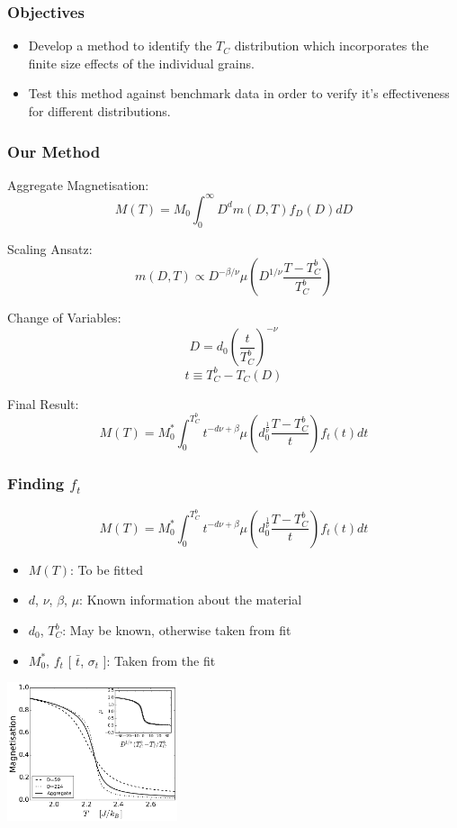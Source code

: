 \documentclass{beamer}
\begin{document}
\begin{frame}
	\frametitle{Objectives}
	\begin{itemize}
		\item{Develop a method to identify the $T_C$ distribution which incorporates the finite size effects of the individual grains.\newline}
		\item{Test this method against benchmark data in order to verify it's effectiveness for different distributions.\newline}
	\end{itemize}
\end{frame}

\begin{frame}
	\frametitle{Our Method}
	Aggregate Magnetisation:
	$$
	M(T) = M_0\int_0^\infty D^{d} m(D,T) f_D(D) dD
	$$
	
	Scaling Ansatz:
	$$
	m(D,T) \propto D^{-\beta/\nu} \mu \left(D^{1/\nu}\frac{T-T_C^b}{T_C^b}\right)
	$$
	
	Change of Variables:
	$$
	D = d_0\left(\frac{t}{T_C^b}\right)^{-\nu}
	$$
	$$
	t \equiv T_C^b - T_C(D)
	$$
	
	Final Result:
	$$
	M(T) = M_0^*\int_0^{T_C^b} t^{-d\nu +\beta} \mu\left(d_0^{\frac{1}{\nu}}\frac{T-T_C^b}{t}\right) f_t(t) dt
	$$
\end{frame}

\begin{frame}
	\frametitle{Finding $f_t$}
	$$
	M(T) = M_0^*\int_0^{T_C^b} t^{-d\nu +\beta} \mu\left(d_0^{\frac{1}{\nu}}\frac{T-T_C^b}{t}\right) f_t(t) dt
	$$
	
	\begin{itemize}
		\item{$M(T)$: To be fitted}
		\item{$d$, $\nu$, $\beta$, $\mu$: Known information about the material}
		\item{$d_0$, $T_C^b$: May be known, otherwise taken from fit}
		\item{$M_0^*$, $f_t$ [ $\bar{t}$, $\sigma_t$ ]: Taken from the fit}
	\end{itemize}
	
	\begin{center}
	\includegraphics[width=5cm]{Images/Ds}
	\end{center}
\end{frame}
\end{document}
